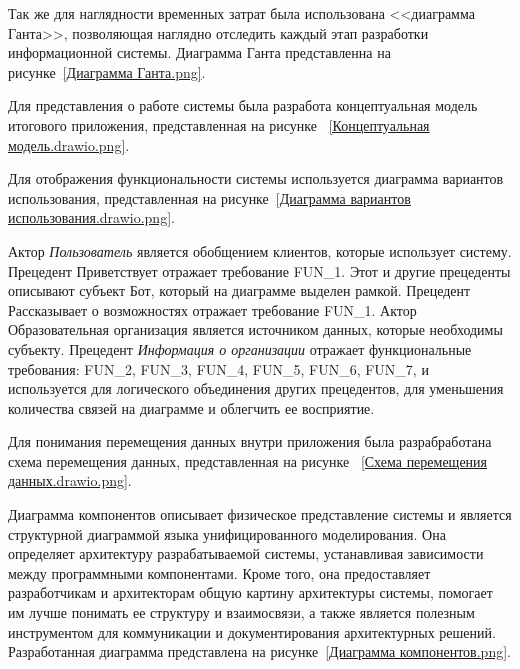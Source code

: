 
Так же для наглядности временных затрат была использована <<диаграмма Ганта>>,
позволяющая наглядно отследить каждый этап разработки информационной системы.
Диаграмма Ганта представленна на рисунке~\ref{Диаграмма Ганта.png}.


Для представления о работе системы была разработа концептуальная модель
итогового приложения, представленная на рисунке
~\ref{Концептуальная модель.drawio.png}.


Для отображения функциональности системы используется диаграмма вариантов
использования, представленная на рисунке~\ref{Диаграмма вариантов использования.drawio.png}.

Актор \emph{Пользователь} является обобщением клиентов, которые использует 
систему. Прецедент Приветствует отражает требование FUN\_1. Этот и другие
прецеденты описывают субъект Бот, который на диаграмме выделен рамкой.
Прецедент Рассказывает о возможностях отражает требование FUN\_1.
Актор Образовательная организация является источником данных, которые 
необходимы субъекту. Прецедент \emph{Информация о организации} отражает
функциональные требования: FUN\_2, FUN\_3, FUN\_4, FUN\_5, FUN\_6, FUN\_7, и
используется для логического объединения других прецедентов, для уменьшения 
количества связей на диаграмме и облегчить ее восприятие.

Для понимания перемещения данных внутри приложения была разрабработана схема
перемещения данных, представленная на рисунке
~\ref{Схема перемещения данных.drawio.png}.


Диаграмма компонентов описывает физическое представление системы и является
структурной диаграммой языка унифицированного моделирования. Она определяет
архитектуру разрабатываемой системы, устанавливая зависимости между 
программными компонентами. Кроме того, она предоставляет разработчикам и
архитекторам общую картину архитектуры системы, помогает им лучше понимать ее
структуру и взаимосвязи, а также является полезным инструментом для
коммуникации и документирования архитектурных решений. Разработанная диаграмма
представлена на рисунке~\ref{Диаграмма компонентов.png}.

